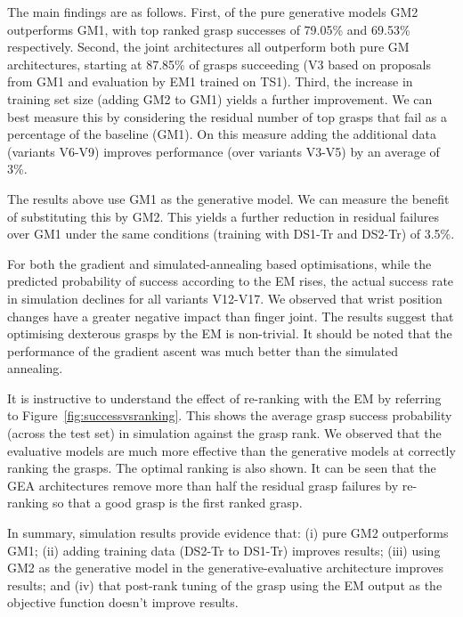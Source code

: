 The main findings are as follows. First, of the pure generative models GM2 outperforms GM1, with top ranked grasp successes of 79.05\% and 69.53\% respectively. Second, the joint architectures all outperform both pure GM architectures, starting at 87.85\% of grasps succeeding (V3 based on proposals from GM1 and evaluation by EM1 trained on TS1). Third, the increase in training set size (adding GM2 to GM1) yields a further improvement. We can best measure this by considering the residual number of top grasps that fail as a percentage of the baseline (GM1). On this measure adding the additional data (variants V6-V9) improves performance (over variants V3-V5) by an average of 3\%. 

The results above use GM1 as the generative model. We can measure the benefit of substituting this by GM2. This yields a further reduction in residual failures over GM1 under the same conditions (training with DS1-Tr and DS2-Tr) of 3.5\%.

For both the gradient and simulated-annealing based optimisations, while the predicted probability of success according to the EM rises, the actual success rate in simulation declines for all variants V12-V17. We observed that wrist position changes have a greater negative impact than finger joint. The results suggest that optimising dexterous grasps by the EM is non-trivial. It should be noted that the performance of the gradient ascent was much better than the simulated annealing.

It is instructive to understand the effect of re-ranking with the EM by referring to Figure~\ref{fig:successvsranking}. This shows the average grasp success probability (across the test set) in simulation against the grasp rank. We observed that the evaluative models are much more effective than the generative models at correctly ranking the grasps. The optimal ranking is also shown. It can be seen that the GEA architectures remove more than half the residual grasp failures by re-ranking so that a good grasp is the first ranked grasp.

In summary, simulation results provide evidence that: (i) pure GM2 outperforms GM1; (ii) adding training data (DS2-Tr to DS1-Tr) improves results; (iii) using GM2 as the generative model in the generative-evaluative architecture improves results; and (iv) that post-rank tuning of the grasp using the EM output as the objective function doesn't improve results.

